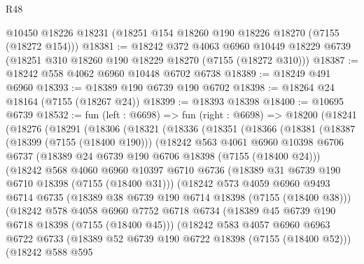 \begin{lexlean}{R48}
\begin{coremodule}
    @10450
    @18226
    @18231
    (@18251 @154 @18260 @190 @18226 @18270 (@7155 (@18272 @154)))
@18381 := @18242
    @372
    @4063
    @6960
    @10449
    @18229
    @6739
    (@18251 @310 @18260 @190 @18229 @18270 (@7155 (@18272 @310)))
@18387 := @18242 @558 @4062 @6960 @10448 @6702 @6738
@18389 := @18249 @491 @6960
@18393 := @18389 @190 @6739 @190 @6702
@18398 := @18264 @24 @18164 (@7155 (@18267 @24))
@18399 := @18393 @18398
@18400 := @10695 @6739
@18532 := fun (left : @6698) =>
  fun (right : @6698) =>
  @18200
    (@18241
      (@18276
        (@18291
          (@18306
            (@18321
              (@18336
                (@18351
                  (@18366
                    (@18381
                      (@18387
                        (@18399 (@7155 (@18400 @190)))
                        (@18242
                          @563
                          @4061
                          @6960
                          @10398
                          @6706
                          @6737
                          (@18389 @24 @6739 @190 @6706 @18398 (@7155 (@18400 @24)))
                          (@18242
                            @568
                            @4060
                            @6960
                            @10397
                            @6710
                            @6736
                            (@18389 @31 @6739 @190 @6710 @18398 (@7155 (@18400 @31)))
                            (@18242
                              @573
                              @4059
                              @6960
                              @9493
                              @6714
                              @6735
                              (@18389 @38 @6739 @190 @6714 @18398 (@7155 (@18400 @38)))
                              (@18242
                                @578
                                @4058
                                @6960
                                @7752
                                @6718
                                @6734
                                (@18389 @45 @6739 @190 @6718 @18398 (@7155 (@18400 @45)))
                                (@18242
                                  @583
                                  @4057
                                  @6960
                                  @6963
                                  @6722
                                  @6733
                                  (@18389 @52 @6739 @190 @6722 @18398 (@7155 (@18400 @52)))
                                  (@18242
                                    @588
                                    @595

\end{coremodule}
\end{lexlean}
